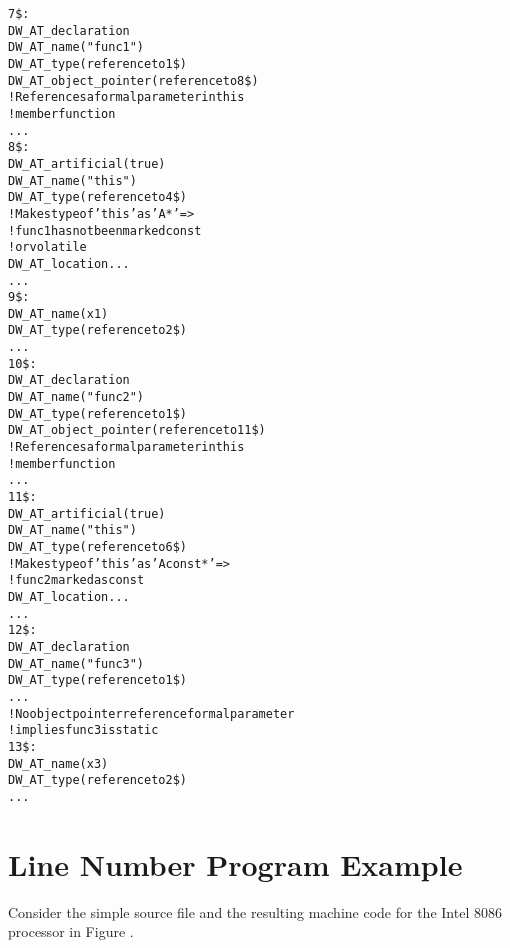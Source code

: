 \begin{alltt}
7\$:    
            DW\_AT\_declaration
            DW\_AT\_name("func1")
            DW\_AT\_type(reference to 1\$)
            DW\_AT\_object\_pointer(reference to 8\$)
                ! References a formal parameter in this 
                ! member function
            ...
8\$:        
                DW\_AT\_artificial(true)
                DW\_AT\_name("this")
                DW\_AT\_type(reference to 4\$)
                    ! Makes type of 'this' as 'A*' =>
                    ! func1 has not been marked const 
                    ! or volatile
                DW\_AT\_location ...
                ...
9\$:        
                DW\_AT\_name(x1)
                DW\_AT\_type(reference to 2\$)
                ...
10\$:    
             DW\_AT\_declaration
             DW\_AT\_name("func2")
             DW\_AT\_type(reference to 1\$)
             DW\_AT\_object\_pointer(reference to 11\$)
             ! References a formal parameter in this 
             ! member function
             ...
11\$:        
                 DW\_AT\_artificial(true)
                 DW\_AT\_name("this")
                 DW\_AT\_type(reference to 6\$)
                     ! Makes type of 'this' as 'A const*' =>
                 !     func2 marked as const
                 DW\_AT\_location ...
                 ...
12\$:    
             DW\_AT\_declaration
             DW\_AT\_name("func3")
             DW\_AT\_type(reference to 1\$)
             ...
                 ! No object pointer reference formal parameter
                 ! implies func3 is static
13\$:        
                 DW\_AT\_name(x3)
                 DW\_AT\_type(reference to 2\$)
                 ...
\end{alltt}

\section{Line Number Program Example}
\label{app:linenumberprogramexample}

Consider the simple source file and the resulting machine
code for the Intel 8086 processor in 
Figure .

